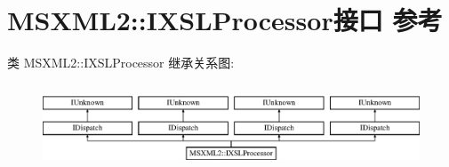 \hypertarget{interface_m_s_x_m_l2_1_1_i_x_s_l_processor}{}\section{M\+S\+X\+M\+L2\+:\+:I\+X\+S\+L\+Processor接口 参考}
\label{interface_m_s_x_m_l2_1_1_i_x_s_l_processor}
类 M\+S\+X\+M\+L2\+:\+:I\+X\+S\+L\+Processor 继承关系图\+:\begin{figure}[H]
\begin{center}
\leavevmode
\includegraphics[height=2.560976cm]{interface_m_s_x_m_l2_1_1_i_x_s_l_processor}
\end{center}
\end{figure}
